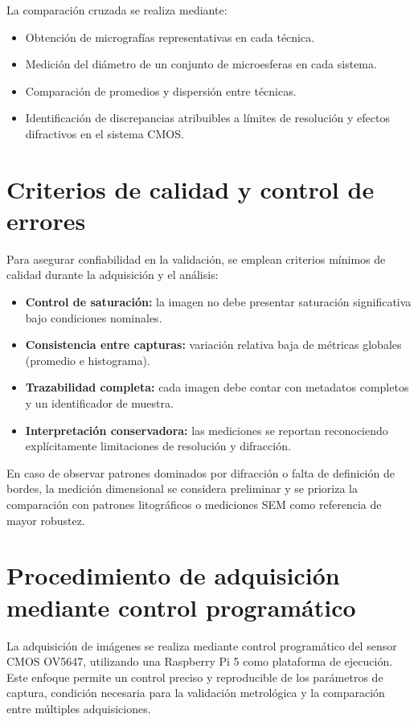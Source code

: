 La comparación cruzada se realiza mediante:

\begin{itemize}
    \item Obtención de micrografías representativas en cada técnica.
    \item Medición del diámetro de un conjunto de microesferas en cada sistema.
    \item Comparación de promedios y dispersión entre técnicas.
    \item Identificación de discrepancias atribuibles a límites de resolución y efectos difractivos en el sistema CMOS.
\end{itemize}

\section{Criterios de calidad y control de errores}

Para asegurar confiabilidad en la validación, se emplean criterios mínimos de calidad durante la adquisición y el análisis:

\begin{itemize}
    \item \textbf{Control de saturación:} la imagen no debe presentar saturación significativa bajo condiciones nominales.
    \item \textbf{Consistencia entre capturas:} variación relativa baja de métricas globales (promedio e histograma).
    \item \textbf{Trazabilidad completa:} cada imagen debe contar con metadatos completos y un identificador de muestra.
    \item \textbf{Interpretación conservadora:} las mediciones se reportan reconociendo explícitamente limitaciones de resolución y difracción.
\end{itemize}

En caso de observar patrones dominados por difracción o falta de definición de bordes, la medición dimensional se considera preliminar y se prioriza la comparación con patrones litográficos o mediciones SEM como referencia de mayor robustez.

\section{Procedimiento de adquisición mediante control programático}

La adquisición de imágenes se realiza mediante control programático del sensor CMOS OV5647, utilizando una Raspberry Pi 5 como plataforma de ejecución. Este enfoque permite un control preciso y reproducible de los parámetros de captura, condición necesaria para la validación metrológica y la comparación entre múltiples adquisiciones.

